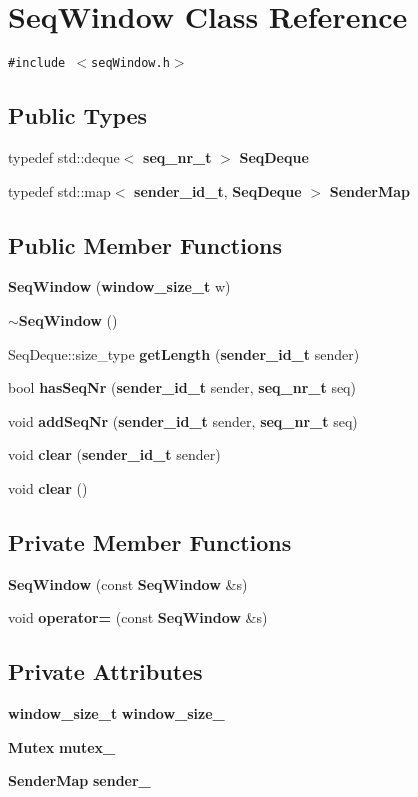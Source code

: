 \section{Seq\-Window Class Reference}
\label{classSeqWindow}
{\tt \#include $<$seq\-Window.h$>$}

\subsection*{Public Types}
\begin{CompactItemize}
\item 
typedef std::deque$<$ {\bf seq\_\-nr\_\-t} $>$ {\bf Seq\-Deque}
\item 
typedef std::map$<$ {\bf sender\_\-id\_\-t}, {\bf Seq\-Deque} $>$ {\bf Sender\-Map}
\end{CompactItemize}
\subsection*{Public Member Functions}
\begin{CompactItemize}
\item 
{\bf Seq\-Window} ({\bf window\_\-size\_\-t} w)
\item 
{\bf $\sim$Seq\-Window} ()
\item 
Seq\-Deque::size\_\-type {\bf get\-Length} ({\bf sender\_\-id\_\-t} sender)
\item 
bool {\bf has\-Seq\-Nr} ({\bf sender\_\-id\_\-t} sender, {\bf seq\_\-nr\_\-t} seq)
\item 
void {\bf add\-Seq\-Nr} ({\bf sender\_\-id\_\-t} sender, {\bf seq\_\-nr\_\-t} seq)
\item 
void {\bf clear} ({\bf sender\_\-id\_\-t} sender)
\item 
void {\bf clear} ()
\end{CompactItemize}
\subsection*{Private Member Functions}
\begin{CompactItemize}
\item 
{\bf Seq\-Window} (const {\bf Seq\-Window} \&s)
\item 
void {\bf operator=} (const {\bf Seq\-Window} \&s)
\end{CompactItemize}
\subsection*{Private Attributes}
\begin{CompactItemize}
\item 
{\bf window\_\-size\_\-t} {\bf window\_\-size\_\-}
\item 
{\bf Mutex} {\bf mutex\_\-}
\item 
{\bf Sender\-Map} {\bf sender\_\-}
\end{CompactItemize}


